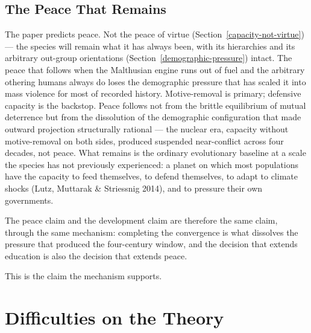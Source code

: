 \documentclass[12pt,letterpaper]{article}
\begin{document}
\subsection{The Peace That Remains}\label{the-peace-that-remains}

The paper predicts peace. Not the peace of virtue
(Section~\ref{capacity-not-virtue}) --- the species will remain what
it has always been, with its hierarchies and its arbitrary out-group
orientations (Section~\ref{demographic-pressure}) intact. The peace
that follows when the Malthusian engine runs out of fuel and the
arbitrary othering humans always do loses the demographic pressure
that has scaled it into mass violence for most of recorded history. Motive-removal is primary;
defensive capacity is the backstop. Peace follows not from the
brittle equilibrium of mutual deterrence but from the dissolution of
the demographic configuration that made outward projection
structurally rational --- the nuclear era, capacity without
motive-removal on both sides, produced suspended near-conflict across
four decades, not peace. What remains is the ordinary evolutionary
baseline at a scale the species has not previously experienced: a
planet on which most populations have the capacity to feed
themselves, to defend themselves, to adapt to climate shocks
(Lutz, Muttarak \& Striessnig 2014), and to pressure their own
governments.

The peace claim and the development claim are therefore the same
claim, through the same mechanism: completing the convergence is what
dissolves the pressure that produced the four-century window, and the
decision that extends education is also the decision that extends
peace.

This is the claim the mechanism supports.

\section{Difficulties on the Theory}\label{difficulties-on-the-theory}
\end{document}
